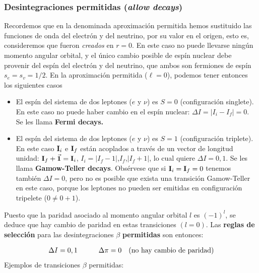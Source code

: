 \subsubsection{Desintegraciones permitidas (\textit{allow decays})}


Recordemos que en la denominada aproximación permitida hemos sustituido las funciones de onda del electrón y del neutrino, por su valor en el origen, esto es, consideremos que fueron \textit{creados} en $r=0$. En este caso no puede llevarse ningún momento angular orbital, y el único cambio posible de espín nuclear debe provenir del espín del electrón y del neutrino, que ambos son fermiones de espín $s_e=s_v=1/2$. En la aproximación permitida ($\ell=0$), podemos tener entonces los siguientes casos

\begin{itemize}
	\item El espín del sistema de dos leptones ($e$ y $\nu$) es $S=0$ (configuración singlete). En este caso no puede haber cambio en el espín nuclear: $\Delta I=|I_i-I_f|=0$. Se les llama \textbf{Fermi decays.}
	\item El espín del sistema de dos leptones ($e$ y $\nu$) es $S=1$ (configuración triplete). En este caso $\mathbf{I}_i$ e $\mathbf{I}_f$ están acoplados a través de un vector de longitud unidad: $\mathbf{I}_f + \vec{\mathbf{1}} = \mathbf{I}_i$, $I_i=|I_f-1|$,$I_f$,$|I_f+1|$, lo cual quiere $\Delta I = 0,1$. Se les llama \textbf{Gamow-Teller decays}. Obsérvese que si $\mathbf{I}_i=\mathbf{I}_f=0$ tenemos también $\Delta I=0$, pero no es posible que exista una transición Gamow-Teller en este caso, porque los leptones no pueden ser emitidas en configuración tripelete ($0\neq 0+1$).
\end{itemize}
Puesto que la paridad asociado al momento angular orbital $l$ es $(-1)^l$, se deduce que hay cambio de paridad en estas transiciones $(l=0)$. Las \textbf{reglas de selección} para las desintegraciones $\beta$ \textbf{permitidas} son entonces:

\begin{eqnarray}
	\Delta I =0,1 \quad \quad \quad \Delta \pi = 0 \quad (\text{no hay cambio de paridad})
\end{eqnarray}
Ejemplos de transiciones $\beta$ permitidas:

